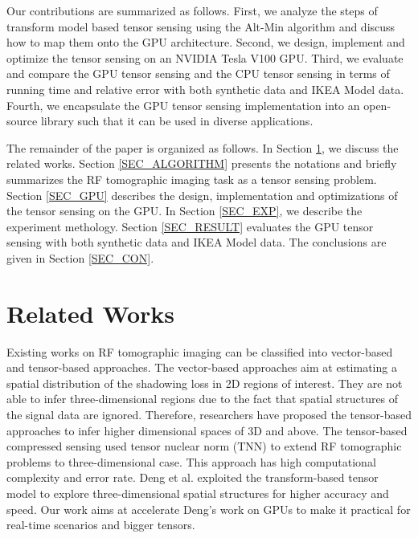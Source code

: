 \documentclass[futureinternet,article,submit,moreauthors,pdftex,10pt,a4paper]{Definitions/mdpi}
\theoremstyle{plain}
\theoremstyle{definition}
\theoremstyle{remark}
\begin{document}
Our contributions are summarized as follows. First, we analyze the steps of transform model based tensor sensing using the Alt-Min algorithm and discuss how to map them onto the GPU architecture. Second, we design, implement and optimize the tensor sensing on an NVIDIA Tesla V100 GPU. Third, we evaluate and compare the GPU tensor sensing and the CPU tensor sensing in terms of running time and relative error with both synthetic data and IKEA Model data. Fourth, we encapsulate the GPU tensor sensing implementation into an open-source library such that it can be used in diverse applications.

The remainder of the paper is organized as follows. In Section \ref{SEC_RW}, we discuss the related works. Section \ref{SEC_ALGORITHM} presents the notations and briefly summarizes the RF tomographic imaging task as a tensor sensing problem. Section \ref{SEC_GPU} describes the design, implementation and optimizations of the tensor sensing on the GPU. In Section \ref{SEC_EXP}, we describe the experiment methology. Section \ref{SEC_RESULT} evaluates the GPU tensor sensing with both synthetic data and IKEA Model data. The conclusions are given in Section \ref{SEC_CON}.

\section{Related Works}
\label{SEC_RW}
Existing works on RF tomographic imaging can be classified into vector-based and tensor-based approaches. The vector-based approaches \cite{kanso2009compressed} \cite{mostofi2011compressive} aim at estimating a spatial distribution of the shadowing loss in 2D regions of interest. They are not able to infer three-dimensional regions due to the fact that spatial structures of the signal data are ignored. Therefore, researchers have proposed the tensor-based approaches \cite{matsuda2017multi} \cite{deng2018tensor} to infer higher dimensional spaces of 3D and above. The tensor-based compressed sensing \cite{matsuda2017multi} used tensor nuclear norm (TNN) \cite{li2013generalized} to extend RF tomographic problems to three-dimensional case. This approach has high computational complexity and error rate. Deng et al. \cite{deng2018tensor} exploited the transform-based tensor model \cite{liu2017fourth} to explore three-dimensional spatial structures for higher accuracy and speed. Our work aims at accelerate Deng's work on GPUs to make it practical for real-time scenarios and bigger tensors.
\end{document}
